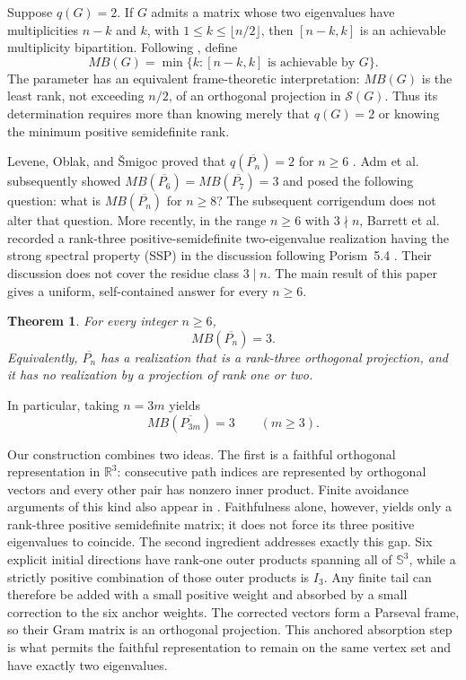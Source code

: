\documentclass[11pt]{article}
\newtheorem{theorem}{Theorem}[section]
\theoremstyle{remark}
\newcommand{\R}{\mathbb{R}}
\newcommand{\Sn}{\mathbb{S}}
\newcommand{\cS}{\mathcal{S}}
\begin{document}
Suppose $q(G)=2$.  If $G$ admits a matrix whose two eigenvalues have
multiplicities $n-k$ and $k$, with $1\le k\le \lfloor n/2\rfloor$, then
$[n-k,k]$ is an achievable multiplicity bipartition.  Following
\cite{AdmEtAl2019}, define
\[
 MB(G)=\min\bigl\{k:[n-k,k]\text{ is achievable by }G\bigr\}.
\]
The parameter has an equivalent frame-theoretic interpretation: $MB(G)$ is
the least rank, not exceeding $n/2$, of an orthogonal projection in
$\cS(G)$.  Thus its determination requires more than knowing merely that
$q(G)=2$ or knowing the minimum positive semidefinite rank.

Levene, Oblak, and \v{S}migoc proved that
$q(\overline{P_n})=2$ for $n\ge6$
\cite[Theorem~3.2]{LeveneOblakSmigoc2019}.  Adm et al.
subsequently showed
$MB(\overline{P_6})=MB(\overline{P_7})=3$ and posed the following question:
what is $MB(\overline{P_n})$ for $n\ge8$?
\cite[Question~5.1]{AdmEtAl2019}  The subsequent corrigendum
\cite{AdmEtAl2020Corrigendum} does not alter that question.  More recently,
in the range $n\ge6$ with $3\nmid n$, Barrett et al. recorded a rank-three
positive-semidefinite two-eigenvalue realization having the strong spectral property (SSP)
in the discussion following Porism~5.4
\cite[p.~160]{BarrettEtAl2026}.  Their discussion does not cover the residue
class $3\mid n$.  The main result of this paper gives a uniform,
self-contained answer for every $n\ge6$.

\begin{theorem}\label{thm:main}
For every integer $n\ge6$,
\[
             MB(\overline{P_n})=3.
\]
Equivalently, $\overline{P_n}$ has a realization that is a rank-three
orthogonal projection, and it has no realization by a projection of rank
one or two.
\end{theorem}

In particular, taking $n=3m$ yields
\[
             MB(\overline{P_{3m}})=3 \qquad (m\ge3).
\]

Our construction combines two ideas.  The first is a faithful orthogonal
representation in $\R^3$: consecutive path indices are represented by
orthogonal vectors and every other pair has nonzero inner product.  Finite
avoidance arguments of this kind also appear in
\cite[Lemma~5.2]{BarrettEtAl2026}.  Faithfulness alone, however, yields only
a rank-three positive semidefinite matrix; it does not force its three
positive eigenvalues to coincide.  The second ingredient addresses exactly
this gap.  Six explicit initial directions have rank-one outer products
spanning all of $\Sn^3$, while a strictly positive combination of those
outer products is $I_3$.  Any finite tail can therefore be added with a
small positive weight and absorbed by a small correction to the six anchor
weights.  The corrected vectors form a Parseval frame, so their Gram matrix
is an orthogonal projection.  This anchored absorption step is what permits
the faithful representation to remain on the same vertex set and have
exactly two eigenvalues.
\end{document}

